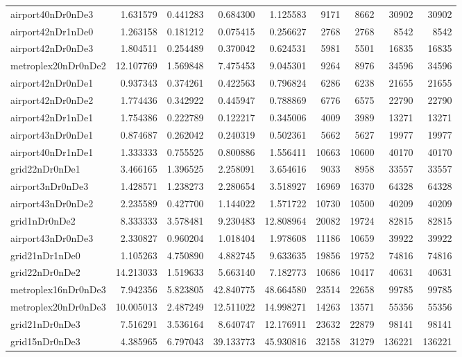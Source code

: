 \begin{longtable}{|l|r|r|r|r|r|r|r|r|}
airport40nDr0nDe3 & 1.631579 & 0.441283 & 0.684300 & 1.125583 & 9171 & 8662 & 30902 & 30902 \\
airport42nDr1nDe0 & 1.263158 & 0.181212 & 0.075415 & 0.256627 & 2768 & 2768 & 8542 & 8542 \\
airport42nDr0nDe3 & 1.804511 & 0.254489 & 0.370042 & 0.624531 & 5981 & 5501 & 16835 & 16835 \\
metroplex20nDr0nDe2 & 12.107769 & 1.569848 & 7.475453 & 9.045301 & 9264 & 8976 & 34596 & 34596 \\
airport42nDr0nDe1 & 0.937343 & 0.374261 & 0.422563 & 0.796824 & 6286 & 6238 & 21655 & 21655 \\
airport42nDr0nDe2 & 1.774436 & 0.342922 & 0.445947 & 0.788869 & 6776 & 6575 & 22790 & 22790 \\
airport42nDr1nDe1 & 1.754386 & 0.222789 & 0.122217 & 0.345006 & 4009 & 3989 & 13271 & 13271 \\
airport43nDr0nDe1 & 0.874687 & 0.262042 & 0.240319 & 0.502361 & 5662 & 5627 & 19977 & 19977 \\
airport40nDr1nDe1 & 1.333333 & 0.755525 & 0.800886 & 1.556411 & 10663 & 10600 & 40170 & 40170 \\
grid22nDr0nDe1 & 3.466165 & 1.396525 & 2.258091 & 3.654616 & 9033 & 8958 & 33557 & 33557 \\
airport3nDr0nDe3 & 1.428571 & 1.238273 & 2.280654 & 3.518927 & 16969 & 16370 & 64328 & 64328 \\
airport43nDr0nDe2 & 2.235589 & 0.427700 & 1.144022 & 1.571722 & 10730 & 10500 & 40209 & 40209 \\
grid1nDr0nDe2 & 8.333333 & 3.578481 & 9.230483 & 12.808964 & 20082 & 19724 & 82815 & 82815 \\
airport43nDr0nDe3 & 2.330827 & 0.960204 & 1.018404 & 1.978608 & 11186 & 10659 & 39922 & 39922 \\
grid21nDr1nDe0 & 1.105263 & 4.750890 & 4.882745 & 9.633635 & 19856 & 19752 & 74816 & 74816 \\
grid22nDr0nDe2 & 14.213033 & 1.519633 & 5.663140 & 7.182773 & 10686 & 10417 & 40631 & 40631 \\
metroplex16nDr0nDe3 & 7.942356 & 5.823805 & 42.840775 & 48.664580 & 23514 & 22658 & 99785 & 99785 \\
metroplex20nDr0nDe3 & 10.005013 & 2.487249 & 12.511022 & 14.998271 & 14263 & 13571 & 55356 & 55356 \\
grid21nDr0nDe3 & 7.516291 & 3.536164 & 8.640747 & 12.176911 & 23632 & 22879 & 98141 & 98141 \\
grid15nDr0nDe3 & 4.385965 & 6.797043 & 39.133773 & 45.930816 & 32158 & 31279 & 136221 & 136221 \\

\end{longtable}
